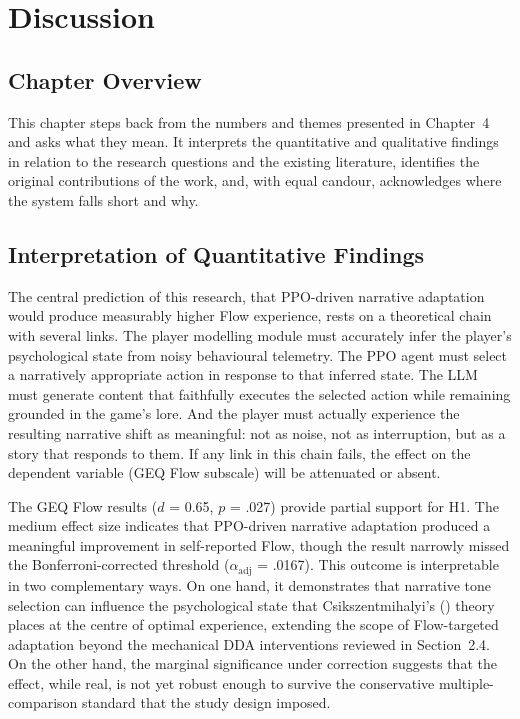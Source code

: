 \chapter{Discussion}

\section{Chapter Overview}

This chapter steps back from the numbers and themes presented in Chapter~4 and asks what they mean. It interprets the quantitative and qualitative findings in relation to the research questions and the existing literature, identifies the original contributions of the work, and, with equal candour, acknowledges where the system falls short and why.

\section{Interpretation of Quantitative Findings}

The central prediction of this research, that PPO-driven narrative adaptation would produce measurably higher Flow experience, rests on a theoretical chain with several links. The player modelling module must accurately infer the player's psychological state from noisy behavioural telemetry. The PPO agent must select a narratively appropriate action in response to that inferred state. The LLM must generate content that faithfully executes the selected action while remaining grounded in the game's lore. And the player must actually experience the resulting narrative shift as meaningful: not as noise, not as interruption, but as a story that responds to them. If any link in this chain fails, the effect on the dependent variable (GEQ Flow subscale) will be attenuated or absent.

The GEQ Flow results ($d$ = 0.65, $p$ = .027) provide partial support for H1. The medium effect size indicates that PPO-driven narrative adaptation produced a meaningful improvement in self-reported Flow, though the result narrowly missed the Bonferroni-corrected threshold ($\alpha_{\text{adj}}$ = .0167). This outcome is interpretable in two complementary ways. On one hand, it demonstrates that narrative tone selection can influence the psychological state that Csikszentmihalyi's (\citeyear{csikszentmihalyi1990flow}) theory places at the centre of optimal experience, extending the scope of Flow-targeted adaptation beyond the mechanical DDA interventions reviewed in Section~2.4. On the other hand, the marginal significance under correction suggests that the effect, while real, is not yet robust enough to survive the conservative multiple-comparison standard that the study design imposed.


